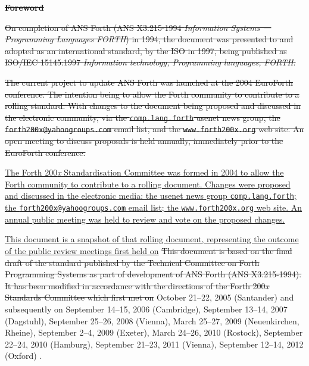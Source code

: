 
\textbf{\textsf{\LARGE \sout{Foreword}}}\cbstart{}
\label{foreword}

\sout{%
On completion of ANS Forth (ANS X3.215-1994 \emph{Information Systems
--- Programming Languages FORTH}) in 1994, the document was presented
to and adopted as an international standard, by the ISO in 1997, being
published as ISO/IEC 15145:1997 \emph{Information technology,
Programming languages, FORTH}.}

\sout{The current project to update ANS Forth was launched at the 2004
EuroForth conference.  The intention being to allow the Forth community
to contribute to a rolling standard.  With changes to the document
being proposed and discussed in the electronic community, via the
\texttt{comp.lang.forth} usenet news group, the
\texttt{forth200x@yahoogroups.com} email list,
and the \texttt{www.forth200x.org} web site.  An open meeting to
discuss proposals is held annually, immediately prior to the EuroForth
conference.}

\uline{%
The Forth 200\emph{x} Standardisation Committee was formed in 2004
to allow the Forth community to contribute to a rolling document. Changes
were proposed and discussed in the electronic media:
the usenet news group \texttt{comp.lang.forth};
the \texttt{forth200x@yahoogroups.com} email list;
the \texttt{www.forth200x.org} web site.
An annual public meeting was held to review and vote on the proposed
changes.}

\uline{%
This document is a snapshot of that rolling document, representing
the outcome of the public review meetings first held on}
\sout{%
This document is based on the final draft of the standard published
by the Technical Committee on Forth Programming Systems as part of
development of ANS Forth (ANS X3.215-1994).
%
It has been modified in accordance with
the directions of the Forth 200\emph{x} Standards Committee which first
met on}
\cbend
October 21--22, 2005 (Santander) and subsequently on
September 14--15, 2006 (Cambridge),
September 13--14, 2007 (Dagstuhl),
September 25--26, 2008 (Vienna),
March 25--27, 2009 (Neuenkirchen, Rheine),
September 2--4, 2009 (Exeter),
March 24--26, 2010 (Rostock),
September 22--24, 2010 (Hamburg),
September 21--23, 2011 (Vienna),
September 12--14, 2012 (Oxford)%
.
